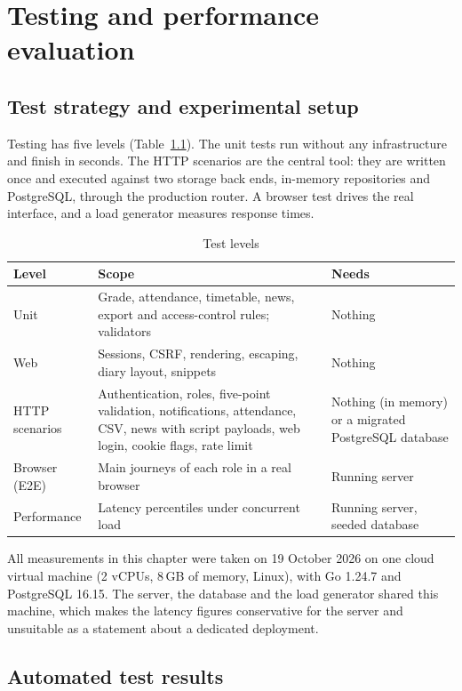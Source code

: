 \chapter{Testing and performance evaluation}

\section{Test strategy and experimental setup}

Testing has five levels (Table~\ref{tab:levels}). The unit tests run without any infrastructure and finish in seconds. The HTTP scenarios are the central tool: they are written once and executed against two storage back ends, in-memory repositories and PostgreSQL, through the production router. A browser test drives the real interface, and a load generator measures response times.

\begin{table}[H]
\centering
\caption{Test levels}
\label{tab:levels}
\small
\begin{tabularx}{\textwidth}{@{}l>{\raggedright\arraybackslash}X>{\raggedright\arraybackslash}p{4.2cm}@{}}
\toprule
Level & Scope & Needs \\
\midrule
Unit & Grade, attendance, timetable, news, export and access-control rules; validators & Nothing \\
Web & Sessions, CSRF, rendering, escaping, diary layout, snippets & Nothing \\
HTTP scenarios & Authentication, roles, five-point validation, notifications, attendance, CSV, news with script payloads, web login, cookie flags, rate limit & Nothing (in memory) or a migrated PostgreSQL database \\
Browser (E2E) & Main journeys of each role in a real browser & Running server \\
Performance & Latency percentiles under concurrent load & Running server, seeded database \\
\bottomrule
\end{tabularx}
\end{table}

All measurements in this chapter were taken on 19 October 2026 on one cloud virtual machine (2 vCPUs, 8\,GB of memory, Linux), with Go 1.24.7 and PostgreSQL 16.15. The server, the database and the load generator shared this machine, which makes the latency figures conservative for the server and unsuitable as a statement about a dedicated deployment.

\section{Automated test results}


